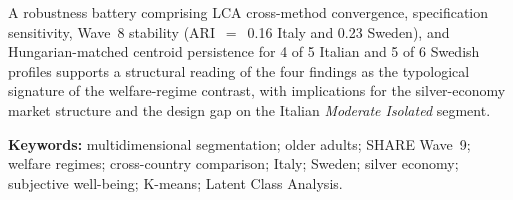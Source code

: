 \vspace{0.15cm}

\noindent A robustness battery comprising LCA cross-method convergence, specification sensitivity, Wave~8 stability (ARI~$=$~0.16 Italy and 0.23 Sweden), and Hungarian-matched centroid persistence for 4 of 5 Italian and 5 of 6 Swedish profiles supports a structural reading of the four findings as the typological signature of the welfare-regime contrast, with implications for the silver-economy market structure and the design gap on the Italian \emph{Moderate Isolated} segment.

\vspace{0.4cm}

\noindent\textbf{Keywords:} multidimensional segmentation; older adults; SHARE Wave~9; welfare regimes; cross-country comparison; Italy; Sweden; silver economy; subjective well-being; K-means; Latent Class Analysis.
